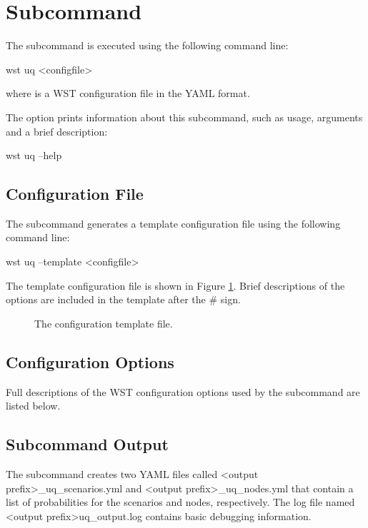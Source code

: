 \section{ Subcommand}\label{sec.uq_subcommand}

The  subcommand is executed using the following command line:
\begin{unknownListing}
wst uq <configfile>
\end{unknownListing}
where  is a WST configuration file in the YAML format.

The  option prints information about this subcommand,
such as usage, arguments and a brief description:
\begin{unknownListing}
wst uq --help
\end{unknownListing}

\subsection{Configuration File}

The  subcommand generates a template configuration
file using the following command line:

\begin{unknownListing}
wst uq --template <configfile>
\end{unknownListing}

The  template configuration file is shown in
Figure \ref{fig:uq_template}. Brief descriptions of the
options are included in the template after the \# sign.

\begin{figure}[h]
  \caption{The  configuration template file.}
  \label{fig:uq_template}
\end{figure}

\subsection{Configuration Options}\label{sec.uq_subcommand.config_options}

Full descriptions of the WST configuration options used by the  subcommand are listed below.


\subsection{Subcommand Output}
The  subcommand creates two YAML files called <output prefix>\_uq\_scenarios.yml and <output prefix>\_uq\_nodes.yml that contain
a list of probabilities for the scenarios and nodes, respectively.
The log file named <output prefix>uq\_output.log contains basic debugging information. 

